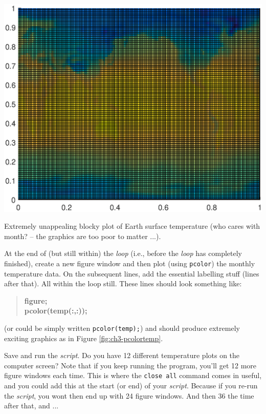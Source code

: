 \documentclass{tufte-book} %
\newenvironment{docspecbold}{\begin{quotation}\ttfamily\bfseries\parskip0pt\parindent0pt\ignorespaces}{\end{quotation}}
\begin{document}
\begin{marginfigure}[0.0in]
\includegraphics[width=\linewidth]{ch3-pcolortemp.eps}
\caption{Extremely unappealing blocky plot of Earth surface temperature (who cares with month? -- the graphics are too poor to matter ...).}
\label{fig:ch3-pcolortemp}
\end{marginfigure}

At the end of (but still within) the \textit{loop} (i.e., before the \textit{loop} has completely finished), create a new \textsf{figure window} and then plot (using \texttt{pcolor}) the monthly temperature data. On the subsequent lines, add the essential labelling stuff (lines after that). All within the loop still. These lines should look something like:
\begin{docspecbold}
figure;
\\pcolor(temp(:,:));
\end{docspecbold}

\noindent (or could be simply written \texttt{pcolor(temp);}) and should produce extremely exciting graphics as in Figure \ref{fig:ch3-pcolortemp}.

Save and run the \textit{script}. Do you have 12 different temperature plots on the computer screen? Note that if you keep running the program, you'll get 12 more figure windows each time. This is where the \texttt{close all} command comes in useful, and you could add this at the start (or end) of your \textit{script}. Because if you re-run the \textit{script}, you wont then end up with 24 figure windows. And then 36 the time after that, and ... 
\end{document}
